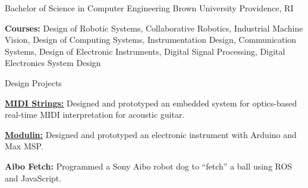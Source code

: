 \begin{cventries}
      \cventry
    {Bachelor of Science in Computer Engineering} %
    {Brown University} %
    {Providence, RI} %
    {} %
    {
      \begin{cvitems} %
        \item {\textbf{Courses:} Design of Robotic Systems, Collaborative Robotics, Industrial Machine Vision, Design of Computing Systems, Instrumentation Design, Communication Systems, Design of Electronic Instruments, Digital Signal Processing, Digital Electronics System Design}
    \end{cvitems}
    }
    \cventry
    {Design Projects}{}{}{}
    {
    \begin{cvitems}
        \item{\href{https://tinyurl.com/SamTitlePortfolio}{\textbf{MIDI Strings:}} Designed and prototyped an embedded system for optics-based real-time MIDI interpretation for acoustic guitar.}
        \item{\href{https://tinyurl.com/SamTitlePortfolio}{\textbf{Modulin:}} Designed and prototyped an electronic instrument with Arduino and Max MSP.}
        \item{\textbf{Aibo Fetch:} Programmed a Sony Aibo robot dog to “fetch” a ball using ROS and JavaScript.}
    \end{cvitems}
    }
\end{cventries}